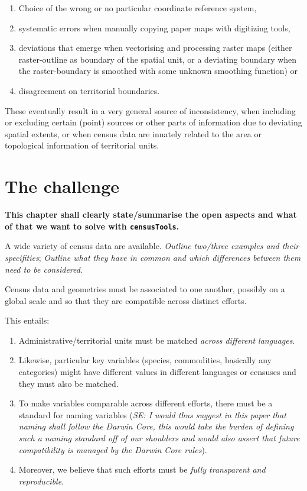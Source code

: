 \documentclass[12pt,]{article}
\providecommand{\tightlist}{%
  \setlength{\itemsep}{0pt}\setlength{\parskip}{0pt}}
\begin{document}
\begin{enumerate}
\def\labelenumi{\arabic{enumi}.}
\tightlist
\item
  Choice of the wrong or no particular coordinate reference system,
\item
  systematic errors when manually copying paper maps with digitizing tools,
\item
  deviations that emerge when vectorising and processing raster maps (either raster-outline as boundary of the spatial unit, or a deviating boundary when the raster-boundary is smoothed with some unknown smoothing function) or
\item
  disagreement on territorial boundaries.
\end{enumerate}

These eventually result in a very general source of inconsistency, when including or excluding certain (point) sources or other parts of information due to deviating spatial extents, or when census data are innately related to the area or topological information of territorial units.

\hypertarget{the-challenge}{%
\section{The challenge}\label{the-challenge}}

\textbf{This chapter shall clearly state/summarise the open aspects and what of that we want to solve with \texttt{censusTools}.}

A wide variety of census data are available. \emph{Outline two/three examples and their specifities}; \emph{Outline what they have in common and which differences between them need to be considered.}

Census data and geometries must be associated to one another, possibly on a global scale and so that they are compatible across distinct efforts.

This entails:

\begin{enumerate}
\def\labelenumi{\arabic{enumi}.}
\tightlist
\item
  Administrative/territorial units must be matched \emph{across different languages}.
\item
  Likewise, particular key variables (species, commodities, basically any categories) might have different values in different languages or censuses and they must also be matched.
\item
  To make variables comparable across different efforts, there must be a standard for naming variables (\emph{SE: I would thus suggest in this paper that naming shall follow the Darwin Core, this would take the burden of defining such a naming standard off of our shoulders and would also assert that future compatibility is managed by the Darwin Core rules}).
\item
  Moreover, we believe that such efforts must be \emph{fully transparent and reproducible}.
\end{enumerate}
\end{document}
